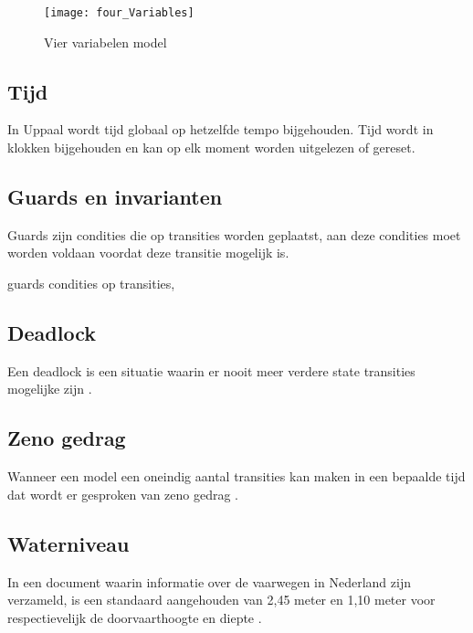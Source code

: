 \begin{figure}[!h]
	\centering
	\texttt{[image: four\_Variables]}
    \caption{Vier variabelen model \cite{thompson2000requirements}}
	\label{fig:four_Variables}
\end{figure}

\subsection{Tijd}
In Uppaal wordt tijd globaal op hetzelfde tempo bijgehouden. Tijd wordt in klokken bijgehouden en kan op elk moment worden uitgelezen of gereset. \cite{uppaalsmalltutorial}
\subsection{Guards en invarianten}
Guards zijn condities die op transities worden geplaatst, aan deze condities moet worden voldaan voordat deze transitie mogelijk is.\cite{uppaalsmalltutorial}


guards condities op transities, 

\subsection{Deadlock} \label{deadlock}

Een deadlock is een situatie waarin er nooit meer verdere state transities mogelijke zijn \cite{uppaalintro}.

\subsection{Zeno gedrag} \label{zenobehavior}
Wanneer een model een oneindig aantal transities kan maken in een bepaalde tijd dat wordt er gesproken van zeno gedrag \cite{uppaaltutorialmodelingpatterns} \cite{leine2011zeno}.

\subsection{Waterniveau}

In een document waarin informatie over de vaarwegen in Nederland zijn verzameld, is een standaard aangehouden van 2,45 meter en 1,10 meter voor respectievelijk de doorvaarthoogte en diepte \cite{vaarwegennederland2017}. 